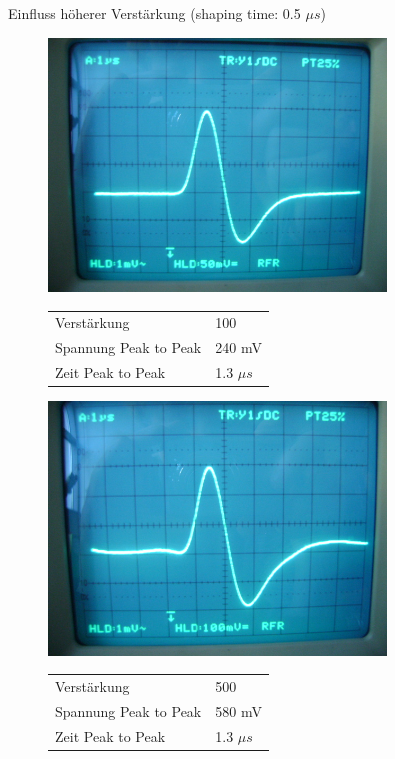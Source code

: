 Einfluss höherer Verstärkung (shaping time: 0.5 $\mu s$)
\begin{figure}[H]
\begin{minipage}{0.5\textwidth}
\centering \includegraphics[width = 0.8\textwidth]{messergebnisse/3.JPG} 
\centering \begin{tabular}{l l}
Verstärkung & 100\\
Spannung Peak to Peak & 240 mV\\
Zeit Peak to Peak & 1.3 $\mu s$
\end{tabular}
\end{minipage}
\begin{minipage}{0.5\textwidth}
\centering \includegraphics[width = 0.8\textwidth]{messergebnisse/4.JPG}
\centering \begin{tabular}{l l}
Verstärkung & 500\\
Spannung Peak to Peak & 580 mV\\
Zeit Peak to Peak & 1.3 $\mu s$
\end{tabular}
\end{minipage}
\end{figure}

